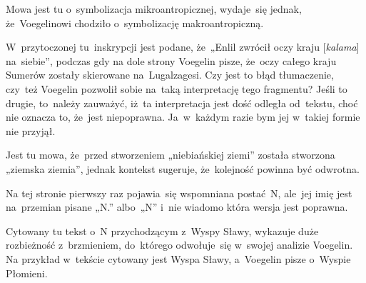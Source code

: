 \documentclass[a4paper,11pt]{article}
\begin{document}

\vspace{0em}



\vspace{0em}


\noindent
{} Mowa jest tu o~symbolizacja mikroantropicznej, wydaje~się
jednak, że~Voegelinowi chodziło o~symbolizację makroantropiczną.

\vspace{\spaceFour}





\noindent
{} W~przytoczonej tu~inskrypcji jest podane, że~„Enlil
zwrócił oczy kraju [\textit{kalama}] na~siebie”, podczas gdy na dole
strony Voegelin pisze, że~oczy całego kraju Sumerów zostały skierowane
na~Lugalzagesi. Czy jest to błąd tłumaczenie, czy~też Voegelin
pozwolił sobie na~taką interpretację tego fragmentu? Jeśli to drugie,
to~należy zauważyć, iż~ta interpretacja jest dość odległa od~tekstu,
choć nie oznacza to, że~jest niepoprawna. Ja~w~każdym razie bym jej
w~takiej formie nie przyjął.

\vspace{\spaceFour}





\noindent
{} Jest tu mowa, że~przed stworzeniem „niebiańskiej
ziemi” została stworzona „ziemska ziemia”, jednak kontekst
sugeruje, że~kolejność powinna być odwrotna.

\vspace{\spaceFour}





\noindent
{} Na tej stronie pierwszy raz pojawia~się wspomniana
postać~N, ale~jej imię jest na~przemian pisane „N.” albo~„N” i~nie
wiadomo która wersja jest poprawna.

\vspace{\spaceFour}





\noindent
{} Cytowany tu tekst o~N przychodzącym z~Wyspy Sławy,
wykazuje duże rozbieżność z~brzmieniem, do~którego odwołuje~się
w~swojej analizie Voegelin. Na przykład w~tekście cytowany jest Wyspa
Sławy, a~Voegelin pisze o~Wyspie Płomieni.
\end{document}
